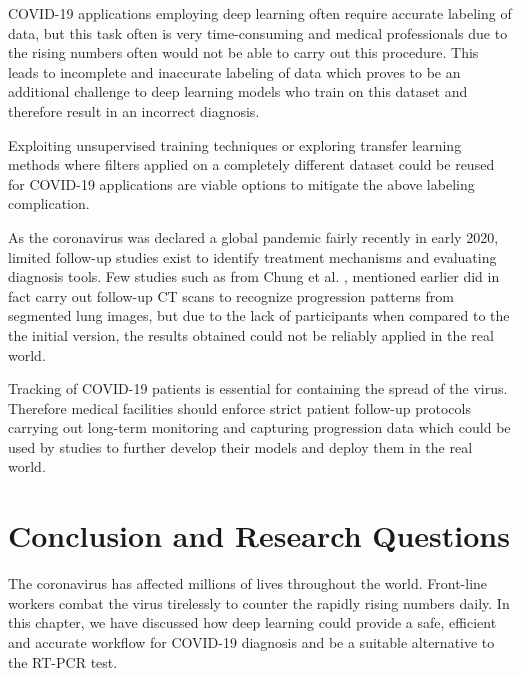 COVID-19 applications employing deep learning often require accurate 
labeling of data, but this task often is very time-consuming and medical 
professionals due to the rising numbers often would not be able to carry out 
this procedure. This leads to incomplete and inaccurate labeling of data which 
proves to be an additional challenge to deep learning models who train on this 
dataset and therefore result in an incorrect diagnosis.

Exploiting unsupervised training techniques \cite{NVF+2018, DGE2015} or exploring transfer learning methods \cite{TFK+2018}
where filters applied on a completely different dataset could be 
reused for COVID-19 applications are viable options to mitigate the above labeling 
complication.

As the coronavirus was declared a global pandemic fairly recently in early 2020, limited 
follow-up studies exist to identify treatment mechanisms and 
evaluating diagnosis tools. Few studies such as from Chung et al. \cite{CMA+2020}, mentioned earlier 
did in fact carry out follow-up CT scans to recognize progression patterns from 
segmented lung images, but due to the lack of participants when compared to the 
the initial version, the results obtained could not be reliably applied in the real world.


Tracking of COVID-19 patients is essential for containing 
the spread of the virus. Therefore medical facilities should enforce 
strict patient follow-up protocols carrying out long-term monitoring and capturing 
progression data which could be used by studies to further develop their models 
and deploy them in the real world. 
\section{Conclusion and Research Questions}
The coronavirus has affected millions of lives throughout the world. 
Front-line workers combat the virus tirelessly to counter 
the rapidly rising numbers daily. In this chapter, we have discussed 
how deep learning could provide a safe, efficient and accurate 
workflow for COVID-19 diagnosis and be a suitable alternative to 
the RT-PCR test.

